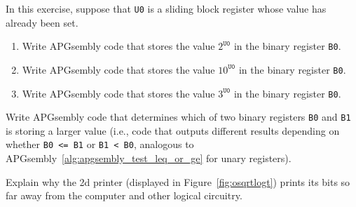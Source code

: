 \begin{multicols}{2}
	
	\mfilbreak
	
	\begin{problem}\label{exer:universal_computation_apgsembly_exponentiate}
		In this exercise, suppose that \texttt{U0} is a sliding block register whose value has already been set.\smallskip
		
		\begin{enumerate}[label=\bf\color{ocre}(\alph*)]
			\item Write APGsembly code that stores the value $2^{\texttt{U0}}$ in the binary register \texttt{B0}.
			
			\item Write APGsembly code that stores the value $10^{\texttt{U0}}$ in the binary register \texttt{B0}.
			
			\item Write APGsembly code that stores the value $3^{\texttt{U0}}$ in the binary register \texttt{B0}.
		\end{enumerate}
	\end{problem}
	
	
	\mfilbreak
	
	
	\begin{problem}\label{exer:universal_computation_apgsembly_binary_compare}
		Write APGsembly code that determines which of two binary registers \texttt{B0} and \texttt{B1} is storing a larger value (i.e., code that outputs different results depending on whether \texttt{B0 <= B1} or \texttt{B1 < B0}, analogous to APGsembly~\ref{alg:apgsembly_test_leq_or_ge} for unary registers).
	\end{problem}
	
	
	\mfilbreak
	
	
	\begin{problem}\label{exer:universal_computation_b2d_why_far}
		Explain why the 2d printer (displayed in Figure~\ref{fig:osqrtlogt}) prints its bits so far away from the computer and other logical circuitry.
		
	\end{problem}
	

\end{multicols}
